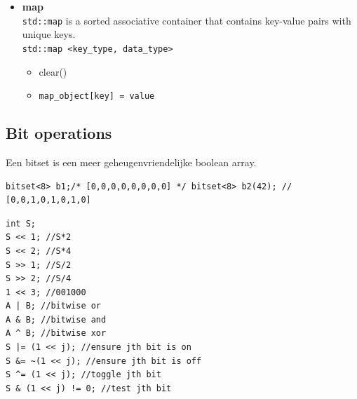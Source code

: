 \documentclass[10pt,a4paper,titlepage]{article}
\DeclareMathOperator{\bigO}{\mathcal{O}}
\begin{document}
\begin{itemize}[noitemsep,nolistsep]
\item \textbf{map}\\
	\texttt{std::map} is a sorted associative container that contains key-value pairs with unique keys.\\
	\texttt{std::map <key\_type, data\_type>}
	\begin{itemize}[noitemsep,nolistsep]
	\item clear() \bigO{size}
	\item \texttt{map\_object[key] = value} \bigO{\text{lg}(size)}
	\end{itemize}
\end{itemize}
\fi
\subsection{Bit operations}
Een bitset is een meer geheugenvriendelijke boolean array.
\begin{lstlisting}
bitset<8> b1;/* [0,0,0,0,0,0,0,0] */ bitset<8> b2(42); // [0,0,1,0,1,0,1,0] 
\end{lstlisting}

\begin{multicols}{2}
\begin{lstlisting}
int S;
S << 1; //S*2
S << 2; //S*4
S >> 1; //S/2
S >> 2; //S/4
1 << 3; //001000
A | B; //bitwise or
A & B; //bitwise and
A ^ B; //bitwise xor
S |= (1 << j); //ensure jth bit is on
S &= ~(1 << j); //ensure jth bit is off
S ^= (1 << j); //toggle jth bit
S & (1 << j) != 0; //test jth bit
\end{lstlisting}
\end{multicols}
\end{document}
